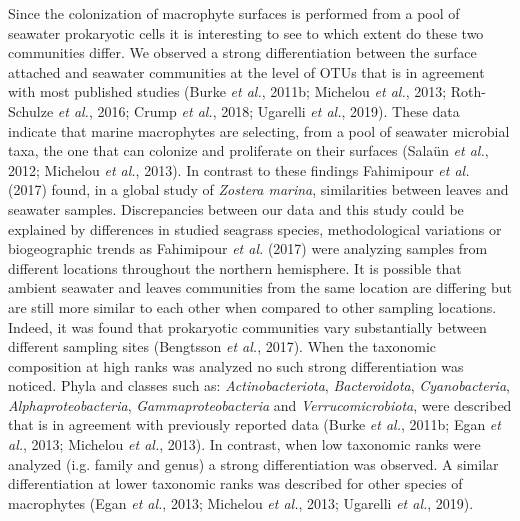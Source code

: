 \documentclass[12pt,]{article}
\begin{document}
Since the colonization of macrophyte surfaces is performed from a pool
of seawater prokaryotic cells it is interesting to see to which extent
do these two communities differ. We observed a strong differentiation
between the surface attached and seawater communities at the level of
OTUs that is in agreement with most published studies (Burke \emph{et
al.}, 2011b; Michelou \emph{et al.}, 2013; Roth-Schulze \emph{et al.},
2016; Crump \emph{et al.}, 2018; Ugarelli \emph{et al.}, 2019). These
data indicate that marine macrophytes are selecting, from a pool of
seawater microbial taxa, the one that can colonize and proliferate on
their surfaces (Salaün \emph{et al.}, 2012; Michelou \emph{et al.},
2013). In contrast to these findings Fahimipour \emph{et al.} (2017)
found, in a global study of \emph{Zostera marina}, similarities between
leaves and seawater samples. Discrepancies between our data and this
study could be explained by differences in studied seagrass species,
methodological variations or biogeographic trends as Fahimipour \emph{et
al.} (2017) were analyzing samples from different locations throughout
the northern hemisphere. It is possible that ambient seawater and leaves
communities from the same location are differing but are still more
similar to each other when compared to other sampling locations. Indeed,
it was found that prokaryotic communities vary substantially between
different sampling sites (Bengtsson \emph{et al.}, 2017). When the
taxonomic composition at high ranks was analyzed no such strong
differentiation was noticed. Phyla and classes such as:
\emph{Actinobacteriota}, \emph{Bacteroidota}, \emph{Cyanobacteria},
\emph{Alphaproteobacteria}, \emph{Gammaproteobacteria} and
\emph{Verrucomicrobiota}, were described that is in agreement with
previously reported data (Burke \emph{et al.}, 2011b; Egan \emph{et
al.}, 2013; Michelou \emph{et al.}, 2013). In contrast, when low
taxonomic ranks were analyzed (i.g. family and genus) a strong
differentiation was observed. A similar differentiation at lower
taxonomic ranks was described for other species of macrophytes (Egan
\emph{et al.}, 2013; Michelou \emph{et al.}, 2013; Ugarelli \emph{et
al.}, 2019).
\end{document}
